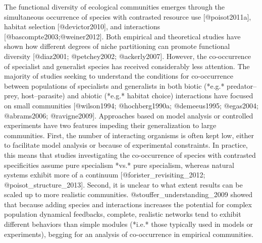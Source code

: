The functional diversity of ecological communities emerges through
the simultaneous occurrence of species with contrasted resource use
[@poisot2011a], habitat selection [@devictor2010], and interactions
[@bascompte2003;@weiner2012]. Both empirical and theoretical studies have
shown how different degrees of niche partitioning can promote functional
diversity [@diaz2001; @petchey2002; @ackerly2007]. However, the co-occurrence
of specialist and generalist species has received considerably less
attention. The majority of studies seeking to understand the conditions
for co-occurrence between populations of specialists and generalists in
both biotic (*e.g.* predator–prey, host–parasite) and abiotic (*e.g.*
habitat choice) interactions have focused on small communities [@wilson1994;
@hochberg1990a; @demeeus1995; @egas2004; @abrams2006; @ravigne2009]. Approaches
based on model analysis or controlled experiments have two features impeding
their generalization to large communities. First, the number of interacting
organisms is often kept low, either to facilitate model analysis or because of
experimental constraints. In practice, this means that studies investigating
the co-occurrence of species with contrasted specificities assume pure
specialism *vs.* pure specialism, whereas natural systems exhibit more of
a continuum [@forister_revisiting_2012; @poisot_structure_2013]. Second,
it is unclear to what extent results can be scaled up to more realistic
communities. @stouffer_understanding_2009 showed that because adding species
and interactions increases the potential for complex population dynamical
feedbacks, complete, realistic networks tend to exhibit different behaviors
than simple modules (*i.e.* those typically used in models or experiments),
begging for an analysis of co-occurrence in empirical communities.
